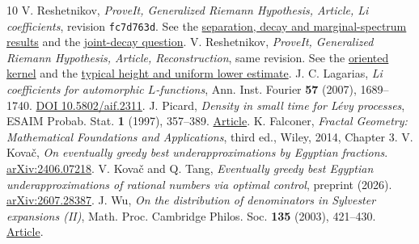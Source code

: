 \documentclass[11pt]{article}
\begin{document}
\begin{thebibliography}{10}
 V. Reshetnikov, \emph{ProveIt, Generalized Riemann Hypothesis, Article, Li coefficients}, revision \texttt{fc7d763d}. See the \href{https://github.com/VladimirReshetnikov/ProveIt/blob/fc7d763da930f3231ecb3bafe0f49f4e0d4bb9a4/Analysis/GeneralizedRiemannHypothesis/Article/sections/li.tex\#L2301-L2391}{separation, decay and marginal-spectrum results} and the \href{https://github.com/VladimirReshetnikov/ProveIt/blob/fc7d763da930f3231ecb3bafe0f49f4e0d4bb9a4/Analysis/GeneralizedRiemannHypothesis/Article/sections/li.tex\#L2786-L2791}{joint-decay question}.
 V. Reshetnikov, \emph{ProveIt, Generalized Riemann Hypothesis, Article, Reconstruction}, same revision. See the \href{https://github.com/VladimirReshetnikov/ProveIt/blob/fc7d763da930f3231ecb3bafe0f49f4e0d4bb9a4/Analysis/GeneralizedRiemannHypothesis/Article/sections/rec.tex\#L918-L957}{oriented kernel} and the \href{https://github.com/VladimirReshetnikov/ProveIt/blob/fc7d763da930f3231ecb3bafe0f49f4e0d4bb9a4/Analysis/GeneralizedRiemannHypothesis/Article/sections/rec.tex\#L1179-L1203}{typical height and uniform lower estimate}.
 J. C. Lagarias, \emph{Li coefficients for automorphic $L$-functions}, Ann. Inst. Fourier \textbf{57} (2007), 1689--1740. \href{https://doi.org/10.5802/aif.2311}{DOI 10.5802/aif.2311}.
 J. Picard, \emph{Density in small time for L\'evy processes}, ESAIM Probab. Stat. \textbf{1} (1997), 357--389. \href{https://www.numdam.org/item/PS_1997__1__357_0/}{Article}.
 K. Falconer, \emph{Fractal Geometry: Mathematical Foundations and Applications}, third ed., Wiley, 2014, Chapter 3.
 V. Kova\v c, \emph{On eventually greedy best underapproximations by Egyptian fractions}. \href{https://arxiv.org/abs/2406.07218}{arXiv:2406.07218}.
 V. Kova\v c and Q. Tang, \emph{Eventually greedy best Egyptian underapproximations of rational numbers via optimal control}, preprint (2026). \href{https://arxiv.org/abs/2607.28387}{arXiv:2607.28387}.
 J. Wu, \emph{On the distribution of denominators in Sylvester expansions (II)}, Math. Proc. Cambridge Philos. Soc. \textbf{135} (2003), 421--430. \href{https://www.cambridge.org/core/journals/mathematical-proceedings-of-the-cambridge-philosophical-society/article/abs/on-the-distribution-of-denominators-in-sylvester-expansions-ii/65D53EA053053A44168312C42B21813E}{Article}.
\end{thebibliography}
\end{document}
